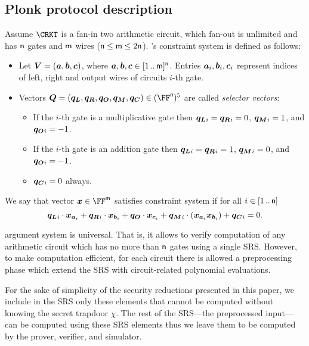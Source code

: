 \subsection{Plonk protocol description}
\label{sec:plonk_explained}
Assume $\CRKT$ is a fan-in two arithmetic circuit,
which fan-out is unlimited and has $\mathsf{n}$ gates and $\mathsf{m}$ wires
($\mathsf{n} \leq \mathsf{m} \leq 2\mathsf{n}$). \plonk's constraint
system is defined as follows:
\begin{itemize}
\item Let $\vec{V} = (\va, \vb, \vc)$, where $\va, \vb, \vc
  \in \range{1}{\noofw}^\numberofconstrains$. Entries $\va_i, \vb_i, \vc_i$ represent indices of left,
  right and output wires of circuits $i$-th gate.
\item Vectors $\vec{Q} = (\vql, \vqr, \vqo, \vqm, \vqc) \in
  (\FF^\numberofconstrains)^5$ are called \emph{selector vectors}:
  \begin{itemize}
  \item If the $i$-th gate is a multiplicative gate then $\vql_i = \vqr_i = 0$,
    $\vqm_i = 1$, and $\vqo_i = -1$. 
  \item If the $i$-th gate is an addition gate then $\vql_i = \vqr_i  = 1$, $\vqm_i =
    0$, and $\vqo_i = -1$. 
  \item $\vqc_i = 0$ always. 
  \end{itemize}
\end{itemize}

We say that vector $\vx \in \FF^\noofw$ satisfies constraint system if for all $i
\in [1 \, .. \, \mathsf{n}]$
\[
  \vql_i \cdot \vx_{\va_i} + \vqr_i \cdot \vx_{\vb_i} + \vqo \cdot \vx_{\vc_i} +
  \vqm_i \cdot (\vx_{\va_i} \vx_{\vb_i}) + \vqc_i = 0. 
\]

\label{sec:plonk_explained}
\plonk{} argument system is universal. That is, it allows to verify computation
of any arithmetic circuit which has no more than $\mathsf{n}$
gates using a single SRS. However, to make computation efficient, for each
circuit there is allowed a preprocessing phase which extend the SRS with
circuit-related polynomial evaluations.

For the sake of simplicity of the security reductions presented in this paper, we
include in the SRS only these elements that cannot be computed without knowing
the secret trapdoor $\chi$. The rest of the SRS---the preprocessed input---can
be computed using these SRS elements thus we leave them to be computed by the
prover, verifier, and simulator.

